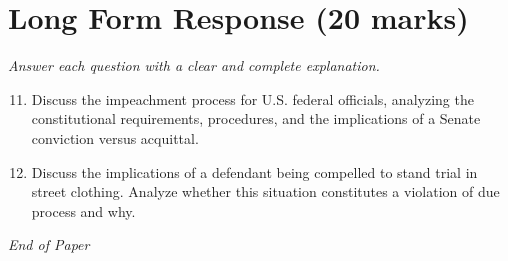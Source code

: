 \documentclass[12pt]{article}
\begin{document}
\section*{Long Form Response (20 marks)}
\textit{Answer each question with a clear and complete explanation.}
\begin{enumerate}[label=\arabic*.]
\setcounter{enumi}{10}
\item Discuss the impeachment process for U.S. federal officials, analyzing the constitutional requirements, procedures, and the implications of a Senate conviction versus acquittal.
\item Discuss the implications of a defendant being compelled to stand trial in street clothing. Analyze whether this situation constitutes a violation of due process and why.
\end{enumerate}

\vfill
\noindent\textit{End of Paper}
\end{document}
